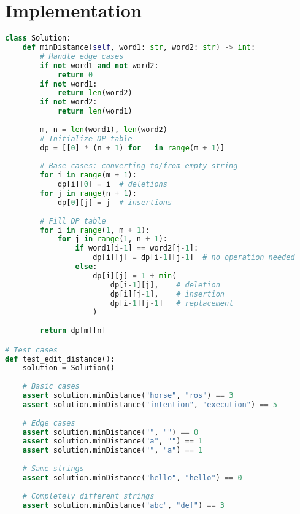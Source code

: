 
\section*{Implementation}
\begin{fullwidth}
\begin{lstlisting}[language=Python]
class Solution:
    def minDistance(self, word1: str, word2: str) -> int:
        # Handle edge cases
        if not word1 and not word2:
            return 0
        if not word1:
            return len(word2)
        if not word2:
            return len(word1)
            
        m, n = len(word1), len(word2)
        # Initialize DP table
        dp = [[0] * (n + 1) for _ in range(m + 1)]
        
        # Base cases: converting to/from empty string
        for i in range(m + 1):
            dp[i][0] = i  # deletions
        for j in range(n + 1):
            dp[0][j] = j  # insertions
            
        # Fill DP table
        for i in range(1, m + 1):
            for j in range(1, n + 1):
                if word1[i-1] == word2[j-1]:
                    dp[i][j] = dp[i-1][j-1]  # no operation needed
                else:
                    dp[i][j] = 1 + min(
                        dp[i-1][j],    # deletion
                        dp[i][j-1],    # insertion
                        dp[i-1][j-1]   # replacement
                    )
        
        return dp[m][n]

# Test cases
def test_edit_distance():
    solution = Solution()
    
    # Basic cases
    assert solution.minDistance("horse", "ros") == 3
    assert solution.minDistance("intention", "execution") == 5
    
    # Edge cases
    assert solution.minDistance("", "") == 0
    assert solution.minDistance("a", "") == 1
    assert solution.minDistance("", "a") == 1
    
    # Same strings
    assert solution.minDistance("hello", "hello") == 0
    
    # Completely different strings
    assert solution.minDistance("abc", "def") == 3
\end{lstlisting}
\end{fullwidth}

